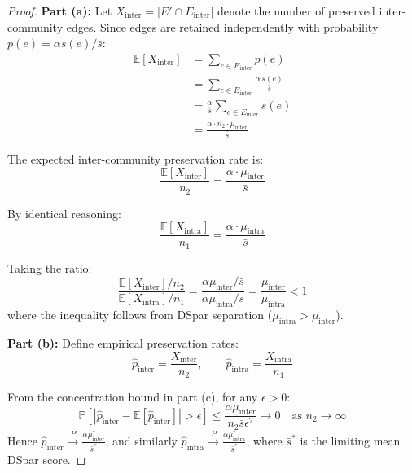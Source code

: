 \documentclass[10pt,journal,compsoc]{IEEEtran}
\begin{document}
\begin{proof}
\textbf{Part (a):} Let $X_{\text{inter}} = |E' \cap E_{\text{inter}}|$ denote the number of preserved inter-community edges. Since edges are retained independently with probability $p(e) = \alpha s(e)/\bar{s}$:
\begin{equation}
\begin{aligned}
\mathbb{E}[X_{\text{inter}}]
&= \sum_{e \in E_{\text{inter}}} p(e) \\
&= \sum_{e \in E_{\text{inter}}} \frac{\alpha\, s(e)}{\bar{s}} \\
&= \frac{\alpha}{\bar{s}} \sum_{e \in E_{\text{inter}}} s(e) \\
&= \frac{\alpha \cdot n_2 \cdot \mu_{\text{inter}}}{\bar{s}}
\end{aligned}
\end{equation}


The expected inter-community preservation rate is:
\begin{equation}
\frac{\mathbb{E}[X_{\text{inter}}]}{n_2} = \frac{\alpha \cdot \mu_{\text{inter}}}{\bar{s}}
\end{equation}

By identical reasoning:
\begin{equation}
\frac{\mathbb{E}[X_{\text{intra}}]}{n_1} = \frac{\alpha \cdot \mu_{\text{intra}}}{\bar{s}}
\end{equation}

Taking the ratio:
\begin{equation}
\frac{\mathbb{E}[X_{\text{inter}}]/n_2}{\mathbb{E}[X_{\text{intra}}]/n_1} = \frac{\alpha \mu_{\text{inter}}/\bar{s}}{\alpha \mu_{\text{intra}}/\bar{s}} = \frac{\mu_{\text{inter}}}{\mu_{\text{intra}}} < 1
\end{equation}
where the inequality follows from DSpar separation ($\mu_{\text{intra}} > \mu_{\text{inter}}$).

\textbf{Part (b):} Define empirical preservation rates:
\begin{equation}
\hat{p}_{\text{inter}} = \frac{X_{\text{inter}}}{n_2}, \qquad \hat{p}_{\text{intra}} = \frac{X_{\text{intra}}}{n_1}
\end{equation}

From the concentration bound in part (c), for any $\epsilon > 0$:
\begin{equation}
\mathbb{P}\left[|\hat{p}_{\text{inter}} - \mathbb{E}[\hat{p}_{\text{inter}}]| > \epsilon\right] \leq \frac{\alpha \mu_{\text{inter}}}{n_2 \bar{s} \epsilon^2} \to 0 \quad \text{as } n_2 \to \infty
\end{equation}
Hence $\hat{p}_{\text{inter}} \xrightarrow{P} \frac{\alpha \mu_{\text{inter}}^*}{\bar{s}^*}$, and similarly $\hat{p}_{\text{intra}} \xrightarrow{P} \frac{\alpha \mu_{\text{intra}}^*}{\bar{s}^*}$, where $\bar{s}^*$ is the limiting mean DSpar score.


\end{proof}
\end{document}
